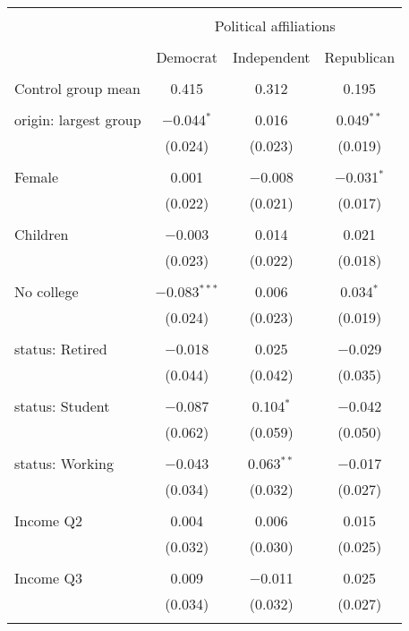 
\begin{tabular}{@{\extracolsep{5pt}}lccc} 
\\[-1.8ex]\hline 
\hline \\[-1.8ex] 
 & \multicolumn{3}{c}{Political affiliations} \\ 
\cline{2-4} 
\\[-1.8ex] & Democrat & Independent & Republican \\ 
\hline \\[-1.8ex] 
 Control group mean & 0.415 & 0.312 & 0.195  \\ \hline \\[-1.8ex] origin: largest group & $-$0.044$^{*}$ & 0.016 & 0.049$^{**}$ \\ 
  & (0.024) & (0.023) & (0.019) \\ 
  & & & \\ 
 Female & 0.001 & $-$0.008 & $-$0.031$^{*}$ \\ 
  & (0.022) & (0.021) & (0.017) \\ 
  & & & \\ 
 Children & $-$0.003 & 0.014 & 0.021 \\ 
  & (0.023) & (0.022) & (0.018) \\ 
  & & & \\ 
 No college & $-$0.083$^{***}$ & 0.006 & 0.034$^{*}$ \\ 
  & (0.024) & (0.023) & (0.019) \\ 
  & & & \\ 
 status: Retired & $-$0.018 & 0.025 & $-$0.029 \\ 
  & (0.044) & (0.042) & (0.035) \\ 
  & & & \\ 
 status: Student & $-$0.087 & 0.104$^{*}$ & $-$0.042 \\ 
  & (0.062) & (0.059) & (0.050) \\ 
  & & & \\ 
 status: Working & $-$0.043 & 0.063$^{**}$ & $-$0.017 \\ 
  & (0.034) & (0.032) & (0.027) \\ 
  & & & \\ 
 Income Q2 & 0.004 & 0.006 & 0.015 \\ 
  & (0.032) & (0.030) & (0.025) \\ 
  & & & \\ 
 Income Q3 & 0.009 & $-$0.011 & 0.025 \\ 
  & (0.034) & (0.032) & (0.027) \\ 
  & & & \\ 

\end{tabular}
